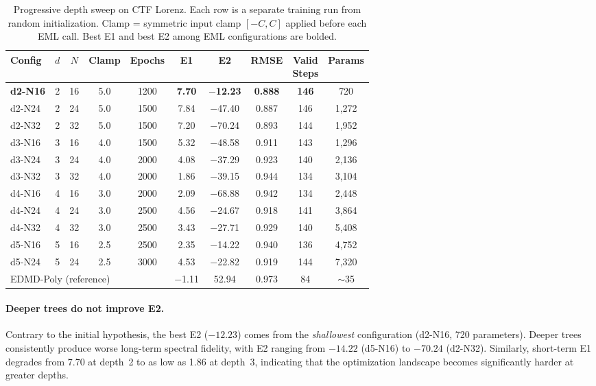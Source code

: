 \documentclass[11pt]{article}
\begin{document}
\begin{table}[t]
\centering
\caption{Progressive depth sweep on CTF Lorenz.  Each row is a separate training
  run from random initialization.  Clamp = symmetric input clamp $[-C, C]$ applied
  before each EML call.  Best E1 and best E2 among EML configurations are bolded.}
\label{tab:depth}
\begin{tabular}{lccccccccc}
\toprule
Config & $d$ & $N$ & Clamp & Epochs & E1 & E2 & RMSE & \shortstack{Valid\\Steps} & Params \\
\midrule
\textbf{d2-N16} & 2 & 16 & 5.0 & 1200 & \textbf{7.70} & \textbf{$-$12.23} & \textbf{0.888} & \textbf{146} & 720 \\
d2-N24 & 2 & 24 & 5.0 & 1500 & 7.84 & $-$47.40 & 0.887 & 146 & 1{,}272 \\
d2-N32 & 2 & 32 & 5.0 & 1500 & 7.20 & $-$70.24 & 0.893 & 144 & 1{,}952 \\
\midrule
d3-N16 & 3 & 16 & 4.0 & 1500 & 5.32 & $-$48.58 & 0.911 & 143 & 1{,}296 \\
d3-N24 & 3 & 24 & 4.0 & 2000 & 4.08 & $-$37.29 & 0.923 & 140 & 2{,}136 \\
d3-N32 & 3 & 32 & 4.0 & 2000 & 1.86 & $-$39.15 & 0.944 & 134 & 3{,}104 \\
\midrule
d4-N16 & 4 & 16 & 3.0 & 2000 & 2.09 & $-$68.88 & 0.942 & 134 & 2{,}448 \\
d4-N24 & 4 & 24 & 3.0 & 2500 & 4.56 & $-$24.67 & 0.918 & 141 & 3{,}864 \\
d4-N32 & 4 & 32 & 3.0 & 2500 & 3.43 & $-$27.71 & 0.929 & 140 & 5{,}408 \\
\midrule
d5-N16 & 5 & 16 & 2.5 & 2500 & 2.35 & $-$14.22 & 0.940 & 136 & 4{,}752 \\
d5-N24 & 5 & 24 & 2.5 & 3000 & 4.53 & $-$22.82 & 0.919 & 144 & 7{,}320 \\
\midrule
\multicolumn{5}{l}{EDMD-Poly (reference)} & $-$1.11 & 52.94 & 0.973 & 84 & $\sim$35 \\
\bottomrule
\end{tabular}
\end{table}

\paragraph{Deeper trees do not improve E2.}
Contrary to the initial hypothesis, the best E2 ($-12.23$) comes from the
\emph{shallowest} configuration (d2-N16, 720 parameters).  Deeper trees
consistently produce worse long-term spectral fidelity, with E2 ranging from
$-14.22$ (d5-N16) to $-70.24$ (d2-N32).  Similarly, short-term E1 degrades
from 7.70 at depth~2 to as low as 1.86 at depth~3, indicating that the
optimization landscape becomes significantly harder at greater depths.
\end{document}
